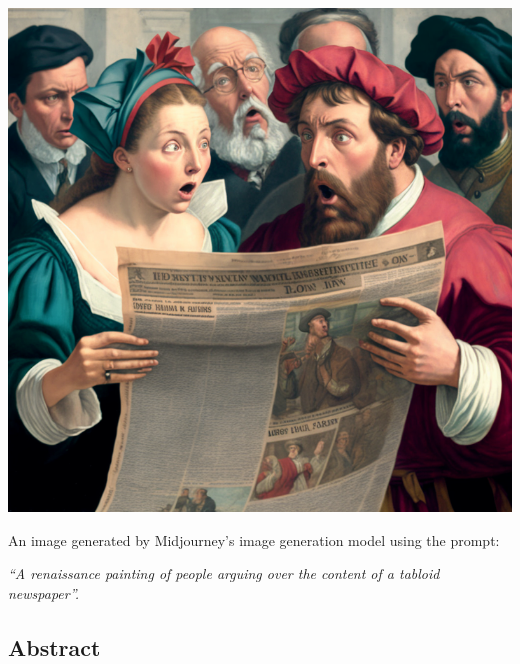 \documentclass[
]{article}
\begin{document}
\vspace*{2cm}

\begin{center}\includegraphics[width=0.8\linewidth]{images/midjourney_gen} \end{center}
\begin{center}
An image generated by Midjourney's image generation model using the prompt: 

\noindent
\emph{“A renaissance painting of people arguing over the content of a tabloid newspaper”.}
\end{center}

\pagebreak

\hypertarget{abstract}{%
\subsection*{Abstract}\label{abstract}}
\end{document}

